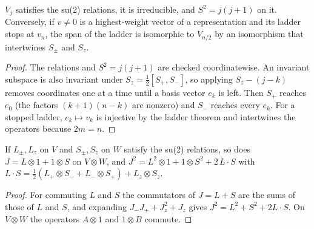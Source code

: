 \begin{theorem}\label{thm:spin-rep}
  \leanok
  $V_j$ satisfies the su(2) relations, it is irreducible, and $S^2=j(j+1)$ on it. Conversely, if $v\ne0$ is a highest-weight
  vector of a representation and its ladder stops at $v_{n}$, the span of the ladder is isomorphic to $V_{n/2}$ by an
  isomorphism that intertwines $S_\pm$ and $S_z$.
\end{theorem}
\begin{proof}\leanok
  The relations and $S^2=j(j+1)$ are checked coordinatewise. An invariant subspace is also invariant under
  $S_z=\tfrac12[S_+,S_-]$, so applying $S_z-(j-k)$ removes coordinates one at a time until a basis vector $e_k$ is left. Then
  $S_+$ reaches $e_0$ (the factors $(k+1)(n-k)$ are nonzero) and $S_-$ reaches every $e_k$. For a stopped ladder, $e_k\mapsto v_k$
  is injective by the ladder theorem and intertwines the operators because $2m=n$.
\end{proof}

\begin{theorem}\label{thm:coupling}
  \leanok
  If $L_\pm,L_z$ on $V$ and $S_\pm,S_z$ on $W$ satisfy the su(2) relations, so does $J=L\otimes1+1\otimes S$ on $V\otimes W$, and
  $J^2=L^2\otimes1+1\otimes S^2+2\,L\cdot S$ with $L\cdot S=\tfrac12(L_+\otimes S_-+L_-\otimes S_+)+L_z\otimes S_z$.
\end{theorem}
\begin{proof}\leanok
  For commuting $L$ and $S$ the commutators of $J=L+S$ are the sums of those of $L$ and $S$, and expanding $J_-J_++J_z^2+J_z$
  gives $J^2=L^2+S^2+2L\cdot S$. On $V\otimes W$ the operators $A\otimes1$ and $1\otimes B$ commute.
\end{proof}

